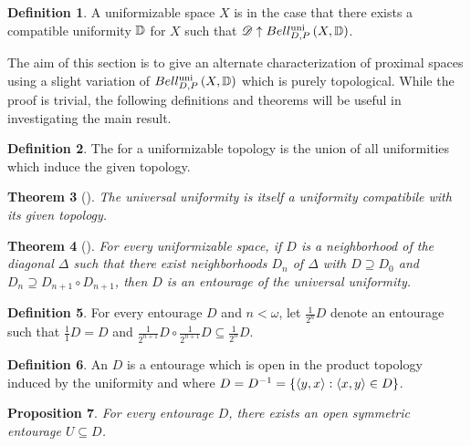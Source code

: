 \documentclass{amsart}
\newtheorem{theorem}{Theorem}[section]
\newtheorem{proposition}[theorem]{Proposition}
\theoremstyle{definition}
\newtheorem{definition}[theorem]{Definition}
\begin{document}
  \begin{definition}
    A uniformizable space \(X\) is 
    in the case that there exists a compatible uniformity
    \(\mathbb{D}\) for \(X\) such that \(\mathscr{D}\uparrow Bell_{D,P}^{\textrm{uni}}\left({X,\mathbb{D}}\right)\).
  \end{definition}

  The aim of this section is to give an alternate characterization of
  proximal spaces using a slight variation of \(Bell_{D,P}^{\textrm{uni}}\left({X,\mathbb{D}}\right)\)
  which is purely topological. While the proof is trivial, the
  following definitions and theorems will be useful in investigating the main
  result.

  \begin{definition}
    The  for a uniformizable topology is the
    union of all uniformities which induce the given topology.
  \end{definition}

  \begin{theorem}[\cite{MR2048350}]
    The universal uniformity is itself a uniformity compatibile with
    its given topology.
  \end{theorem}

  \begin{theorem}[\cite{MR2048350}]\label{halvingEntrouages}
    For every uniformizable space, if \(D\) is a neighborhood of the diagonal
    \(\Delta\)  such that there exist neighborhoods \(D_n\) of \(\Delta\) with
    \(D\supseteq D_0\) and
    \(D_n \supseteq D_{n+1}\circ D_{n+1}\), then \(D\) is an
    entourage of the universal uniformity.
  \end{theorem}

  \begin{definition}
    For every entourage \(D\) and \(n<\omega\), let \(\frac{1}{2^n}D\)
    denote an entourage such that \(\frac{1}{1}D=D\) and
    \(\frac{1}{2^{n+1}}D\circ\frac{1}{2^{n+1}}D\subseteq\frac{1}{2^n}D\).
  \end{definition}

  \begin{definition}
    An  \(D\) is a entourage
    which is open in the product topology induced by the uniformity and where
    \(D=D^{-1}=\{\langle y,x\rangle:\langle x,y\rangle\in D\}\).
  \end{definition}

  \begin{proposition}
    For every entourage \(D\), there exists an open symmetric
    entourage \(U\subseteq D\).
  \end{proposition}
\end{document}
